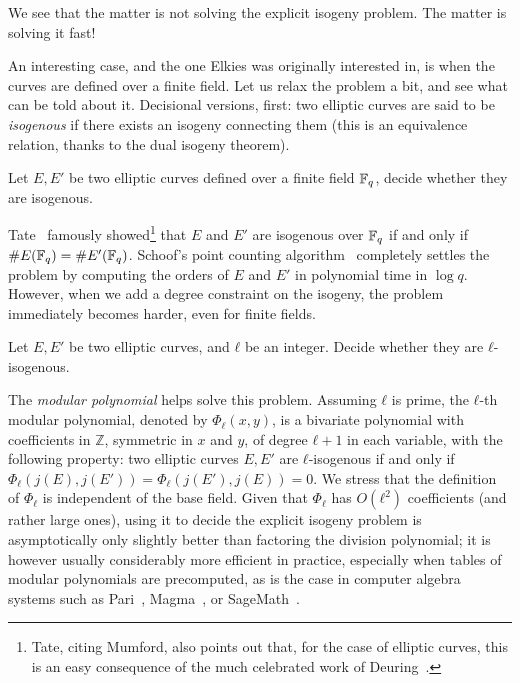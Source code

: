 \documentclass[b5layout]{hdr}
\begin{document}
We see that the matter is not solving the explicit isogeny
problem. The matter is solving it fast!

An interesting case, and the one Elkies was originally interested in,
is when the curves are defined over a finite field. %
Let us relax the problem a bit, and see what can be told about it. %
Decisional versions, first: two elliptic curves are said to be
\emph{isogenous} if there exists an isogeny connecting them (this is
an equivalence relation, thanks to the dual isogeny theorem).

\begin{problem}
  \label{prob:isogenous}
  Let $E,E'$ be two elliptic curves defined over a finite field
  $\mathbb{F}_q$, decide whether they are isogenous.
\end{problem}

Tate~\cite[Th.~1(c)]{Tate} famously showed\footnote{Tate, citing
  Mumford, also points out that, for the case of elliptic curves, this
  is an easy consequence of the much celebrated work of
  Deuring~\cite{deuring41}.} that $E$ and $E'$ are isogenous over
$\mathbb{F}_q$ if and only if $\#E(\mathbb{F}_q)=\#E'(\mathbb{F}_q)$. %
Schoof's point counting algorithm~\cite{schoof85,schoof95} completely
settles the problem by computing the orders of $E$ and $E'$ in
polynomial time in $\log q$. %
However, when we add a degree constraint on the isogeny, the problem immediately
becomes harder, even for finite fields. %

\begin{problem}
  \label{prob:ell-isogenous}
  Let $E,E'$ be two elliptic curves, and $ℓ$ be an integer. Decide
  whether they are $ℓ$-isogenous.
\end{problem}

The \emph{modular polynomial} helps solve this problem. %
Assuming $ℓ$ is prime, the $ℓ$-th modular polynomial, denoted by
$Φ_ℓ(x,y)$, is a bivariate polynomial with coefficients in $ℤ$,
symmetric in $x$ and $y$, of degree $ℓ+1$ in each variable, with the
following property: two elliptic curves $E,E'$ are $ℓ$-isogenous if
and only if $Φ_ℓ(j(E),j(E'))=Φ_ℓ(j(E'),j(E))=0$. %
We stress that the definition of $Φ_ℓ$ is independent of the base
field. %
Given that $Φ_ℓ$ has $O(ℓ^2)$ coefficients (and rather large ones),
using it to decide the explicit isogeny problem is asymptotically only
slightly better than factoring the division polynomial; it is however
usually considerably more efficient in practice, especially when
tables of modular polynomials are precomputed, as is the case in
computer algebra systems such as Pari~\cite{Pari}, Magma~\cite{MAGMA},
or SageMath~\cite{Sage}. %
\end{document}
